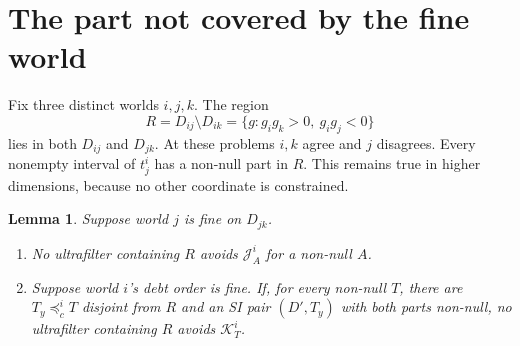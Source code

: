 \documentclass[11pt]{article}
\newtheorem{lemma}[theorem]{Lemma}
\theoremstyle{remark}\newtheorem{remark}[theorem]{Remark}
\newcommand{\J}{\mathcal J}
\newcommand{\K}{\mathcal K}
\begin{document}
\section{The part not covered by the fine world}

Fix three distinct worlds $i,j,k$. The region
\[
 R= D_{ij}\setminus D_{ik}
   =\{g:g_ig_k>0,\ g_ig_j<0\}
\]
lies in both $D_{ij}$ and $D_{jk}$. At these problems $i,k$ agree and
$j$ disagrees. Every nonempty interval of $t^i_j$ has a non-null part
in $R$. This remains true in higher dimensions, because no other
coordinate is constrained.

\begin{lemma}\label{lem:remaining}
Suppose world $j$ is fine on $D_{jk}$.
\begin{enumerate}[label=(\alph*),leftmargin=*]
\item No ultrafilter containing $R$ avoids $\J^i_A$ for a non-null $A$.
\item Suppose world $i$'s debt order is fine. If, for every non-null $T$,
there are $T_y\preceq^i_cT$ disjoint from $R$ and an SI pair $(D',T_y)$
with both parts non-null, no ultrafilter containing $R$ avoids $\K^i_T$.
\end{enumerate}
\end{lemma}
\end{document}
